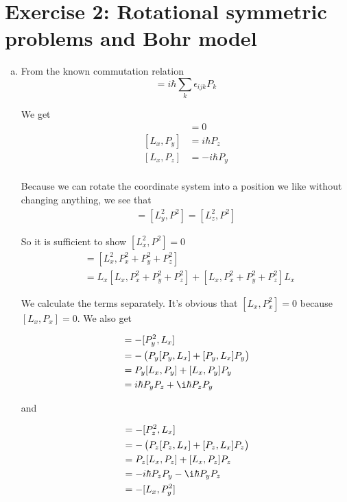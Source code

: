 \documentclass[a4paper,german,12pt,smallheadings]{scrartcl}
\begin{document}
\section*{Exercise 2: Rotational symmetric problems and Bohr model}
\begin{enumerate}[a)]
  \item
    From the known commutation relation
    \begin{equation*}
      [L_i, P_j] = i \hbar \sum_{k} \epsilon_{ijk} P_k
    \end{equation*}

    We get
    \begin{align*}
      [L_x, P_x] &= 0 \\
      [L_x, P_y] &= i \hbar P_z \\
      [L_x, P_z] &= -i \hbar P_y \\
    \end{align*}

    Because we can rotate the coordinate system into a position we like without
    changing anything, we see that
    \begin{align*}
      [L_x^2, P^2] = [L_y^2, P^2] = [L_z^2, P^2]
    \end{align*}

    So it is sufficient to show $[L_x^2, P^2] = 0$
    \begin{align*}
      [L_x^2, P^2] &= [L_x^2, P_x^2 + P_y^2 + P_z^2] \\
                   &= L_x[L_x, P_x^2 + P_y^2 + P_z^2] + [L_x, P_x^2 + P_y^2 + P_z^2]L_x
    \end{align*}

    We calculate the terms separately. It's obvious that $[L_x, P_x^2] = 0$
    because $[L_x, P_x] = 0$. We also get

    \begin{align*}
      [L_x, P_y^2] &= -[P_y^2, L_x] \\ 
                   &= -\del{P_y[P_y, L_x] + [P_y, L_x]P_y} \\
                   &= P_y[L_x, P_y] + [L_x, P_y]P_y \\
                   &= i \hbar P_y P_z + \i \hbar P_z P_y
    \end{align*}

    and

    \begin{align*}
      [L_x, P_z^2] &= -[P_z^2, L_x] \\ 
                   &= -\del{P_z[P_z, L_x] + [P_z, L_x]P_z} \\
                   &= P_z[L_x, P_z] + [L_x, P_z]P_z \\
                   &= -i \hbar P_z P_y - \i \hbar P_y P_z \\
                   &= -[L_x, P_y^2]
    \end{align*}


\end{enumerate}
\end{document}

